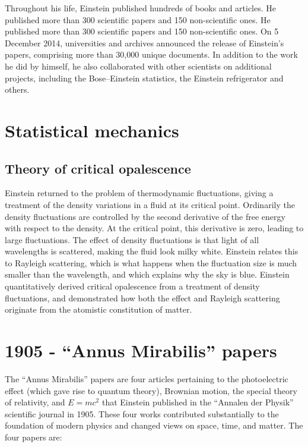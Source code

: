 \documentclass[twoside]{memoir}
\begin{document}
Throughout his life, Einstein published hundreds of books and articles. He published more than 300 scientific papers and 150 non-scientific ones.\cite{Nobel}\cite{e5xd8}
He published more than 300 scientific papers and 150 non-scientific ones. On 5 December 2014, universities and archives announced the release of Einstein's papers, comprising more than 30,000 unique documents. In addition to the work he did by himself, he also collaborated with other scientists on additional projects, including the Bose--Einstein statistics, the Einstein refrigerator and others. 

\chapter{Statistical mechanics}\label{statistical-mechanics}

\section{Theory of critical opalescence}\label{theory-of-critical-opalescence}

Einstein returned to the problem of thermodynamic fluctuations,  giving a treatment of the density variations in a fluid at its critical point. Ordinarily the density fluctuations are controlled by the second derivative of the free energy with respect to the density. At the critical point, this derivative is zero, leading to large fluctuations. The effect of density fluctuations is that light of all wavelengths is scattered, making the fluid look milky white. Einstein relates this to Rayleigh scattering,  which is what happens when the fluctuation size is much smaller than the wavelength, and which explains why the sky is blue.\cite{L2N73} Einstein quantitatively derived critical opalescence from a treatment of density fluctuations, and demonstrated how both the effect and Rayleigh scattering originate from the atomistic constitution of matter.

\chapter{1905 - \enquote{Annus Mirabilis} papers}\label{1905-enquote-annus-mirabilis-papers}

The \enquote{Annus Mirabilis}  papers are four articles pertaining to the photoelectric effect (which gave rise to quantum theory), Brownian motion, the special theory of relativity, and $E = mc^2$ that Einstein published in the \enquote{Annalen der Physik} scientific journal in 1905. These four works contributed substantially to the foundation of modern physics and changed views on space, time, and matter. The four papers are: 
\end{document}
